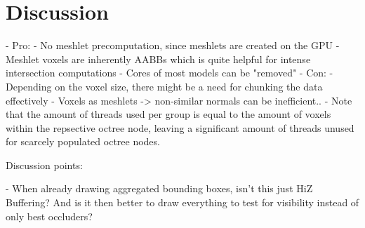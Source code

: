 \chapter{Discussion} \label{cpt-discussion}


- Pro: 
    - No meshlet precomputation, since meshlets are created on the GPU
    - Meshlet voxels are inherently AABBs which is quite helpful for intense intersection computations %
    - Cores of most models can be "removed"
- Con:
    - Depending on the voxel size, there might be a need for chunking the data effectively %
    - Voxels as meshlets -> non-similar normals can be inefficient.. 
    - Note that the amount of threads used per group is equal to the amount of voxels within the repsective octree 
    node, leaving a significant amount of threads unused for scarcely populated octree nodes.


Discussion points:

- When already drawing aggregated bounding boxes, isn't this just HiZ Buffering? And is it then better to draw everything
 to test for visibility instead of only best occluders? 